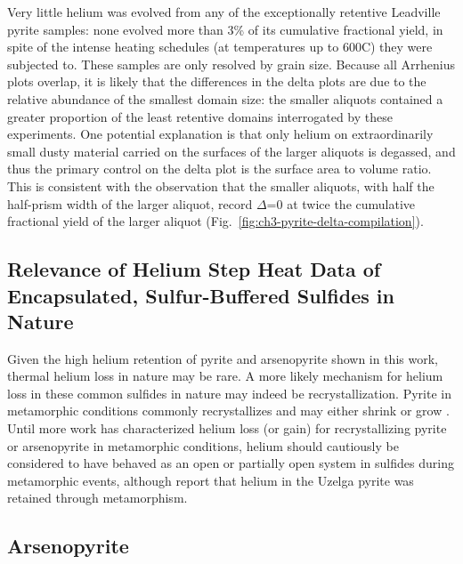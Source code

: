 Very little helium was evolved from any of the exceptionally retentive Leadville pyrite samples: none evolved
more than 3\% of its cumulative fractional yield, in spite of the intense heating schedules (at temperatures up to 600\textdegree C) they were subjected to.
These samples are only resolved by grain size. Because all Arrhenius plots overlap, it is likely that the differences in the 
delta plots are due to the relative abundance of the smallest domain size: the smaller aliquots contained a greater proportion of the least retentive domains interrogated by
these experiments. One potential explanation is that only helium on extraordinarily small dusty material carried on the surfaces of the larger aliquots is degassed,
and thus the primary control on the delta plot is the surface area to volume ratio. This is consistent with the observation that the smaller aliquots, 
with half the half-prism width of the larger aliquot, record $\Delta$=0 at twice the cumulative fractional yield of the larger aliquot (Fig.~\ref{fig:ch3-pyrite-delta-compilation}).


\subsection{Relevance of Helium Step Heat Data of Encapsulated,
Sulfur-Buffered Sulfides in Nature}

Given the high helium retention of pyrite and arsenopyrite shown in this
work, thermal helium loss in nature may be rare. A more likely mechanism for helium loss in these common sulfides in
nature may indeed be recrystallization. Pyrite in metamorphic
conditions commonly recrystallizes and may either shrink or grow \citep{craig1998,mcclayellis1983}. Until more work has characterized helium
loss (or gain) for recrystallizing pyrite or arsenopyrite in metamorphic
conditions, helium should cautiously be considered to have behaved as an
open or partially open system in sulfides during metamorphic events, although \citet{yakubovich2020} report that 
helium in the Uzelga pyrite was retained through metamorphism.

\subsection{Arsenopyrite}\label{ch3-discussion-arsenopyrite}


